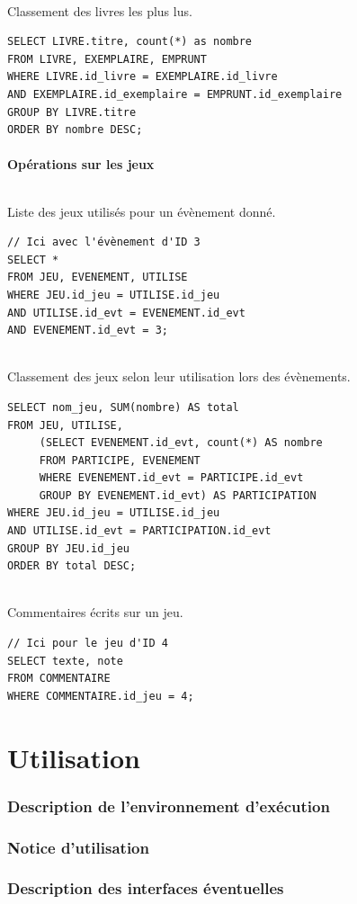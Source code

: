 \documentclass[a4paper, 11pt]{article}
\begin{document}
\paragraph{}
Classement des livres les plus lus.
\begin{verbatim}
SELECT LIVRE.titre, count(*) as nombre 
FROM LIVRE, EXEMPLAIRE, EMPRUNT 
WHERE LIVRE.id_livre = EXEMPLAIRE.id_livre 
AND EXEMPLAIRE.id_exemplaire = EMPRUNT.id_exemplaire 
GROUP BY LIVRE.titre 
ORDER BY nombre DESC;
\end{verbatim}
\subsection{Opérations sur les jeux}
\paragraph{}
Liste des jeux utilisés pour un évènement donné.
\begin{verbatim}
// Ici avec l'évènement d'ID 3
SELECT *
FROM JEU, EVENEMENT, UTILISE
WHERE JEU.id_jeu = UTILISE.id_jeu
AND UTILISE.id_evt = EVENEMENT.id_evt
AND EVENEMENT.id_evt = 3;
\end{verbatim}
\paragraph{}
Classement des jeux selon leur utilisation lors des évènements.
\begin{verbatim}
SELECT nom_jeu, SUM(nombre) AS total
FROM JEU, UTILISE, 
     (SELECT EVENEMENT.id_evt, count(*) AS nombre 
     FROM PARTICIPE, EVENEMENT 
     WHERE EVENEMENT.id_evt = PARTICIPE.id_evt 
     GROUP BY EVENEMENT.id_evt) AS PARTICIPATION
WHERE JEU.id_jeu = UTILISE.id_jeu
AND UTILISE.id_evt = PARTICIPATION.id_evt
GROUP BY JEU.id_jeu
ORDER BY total DESC;
\end{verbatim}
\paragraph{}
Commentaires écrits sur un jeu.
\begin{verbatim}
// Ici pour le jeu d'ID 4
SELECT texte, note 
FROM COMMENTAIRE
WHERE COMMENTAIRE.id_jeu = 4;
\end{verbatim}

\newpage
\part{Utilisation}
\setcounter{section}{0}
\section{Description de l'environnement d'exécution}
\section{Notice d'utilisation}
\section{Description des interfaces éventuelles}
\end{document}
